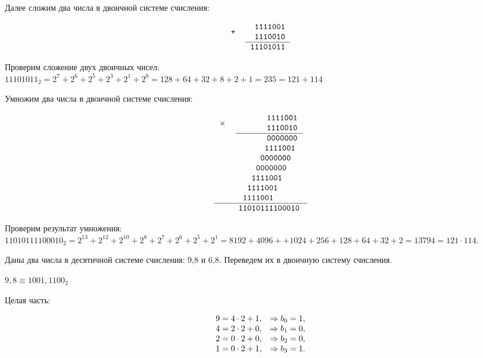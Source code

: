 \documentclass[a4paper,14pt]{extarticle}
\begin{document}
	Далее сложим два числа в двоичной системе счисления:
	
	\[
	\begin{tabular}{{c}{c}}
		\texttt{+} &
		\begin{tabular}{c}
			\texttt{~1111001}\\
			\texttt{~1110010}\\
			\hline
		\end{tabular}\\
		& \texttt{11101011}
	\end{tabular}
	\]
	
	Проверим сложение двух двоичных чисел:\\
	$11101011_2=2^{7}+2^{6}+2^{5}+2^{3}+2^{1}+2^{0}=128+64+32+8+2+1=235=121+114$
	
	Умножим два числа в двоичной системе счисления:
	
	\[
	\begin{tabular}{{c}{c}}
		\texttt{$\times$}&
		\begin{tabular}{c}
			\texttt{~~~~~~1111001}\\
			\texttt{~~~~~~1110010}\\
			\hline
		\end{tabular}\\
		& \texttt{~~~~~~0000000}\\
		& \texttt{~~~~~1111001~}\\
		& \texttt{~~~~0000000~~}\\
		& \texttt{~~~0000000~~~}\\
		& \texttt{~~1111001~~~~}\\
		& \texttt{~1111001~~~~~}\\
		& \texttt{1111001~~~~~~}\\
		\hline
		& \texttt{11010111100010}
	\end{tabular}
	\]
	
	Проверим результат умножения:\\
	$11010111100010_{2}=2^{13}+2^{12}+2^{10}+2^{8}+2^{7}+2^{6}+2^{5}+2^{1}=8192+4096++1024+256+128+64+32+2=13794=121 \cdot 114$.
	
	Даны два числа в десятичной системе счисления: 9,8 и 6,8. Переведем их в двоичную систему счисления.
	
	$9,8 \equiv 1001,1100_{2}$
	
	Целая часть:
	
	\[
	\begin{array}[c]{ll}
		9 = 4 \cdot 2 + 1, &\Rightarrow b_{0} = 1,\\
		4 = 2 \cdot 2 + 0, &\Rightarrow b_{1} = 0,\\
		2 = 0 \cdot 2 + 0, &\Rightarrow b_{2} = 0,\\
		1 = 0 \cdot 2 + 1, &\Rightarrow b_{3} = 1.
	\end{array}
	\]
	
\end{document}
